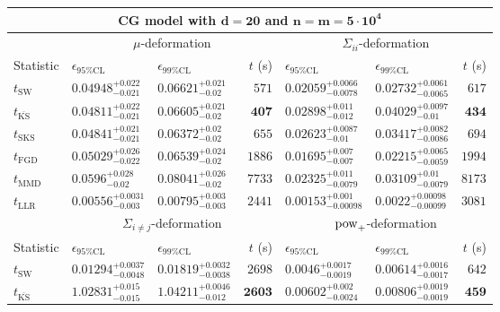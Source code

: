 \begin{tabular}{l|llr|llr}
	\toprule
	\multicolumn{7}{c}{{\bf CG model with $\mathbf{d=20}$ and $\mathbf{n=m=5\cdot 10^{4}}$}} \\
	\toprule
	\multicolumn{1}{c}{} & \multicolumn{3}{c}{$\mu$-deformation} & \multicolumn{3}{c}{$\Sigma_{ii}$-deformation} \\
	Statistic & $\epsilon_{95\%\mathrm{CL}}$ & $\epsilon_{99\%\mathrm{CL}}$ & $t$ (s) & $\epsilon_{95\%\mathrm{CL}}$ & $\epsilon_{99\%\mathrm{CL}}$ & $t$ (s) \\
	\midrule
	$t_{\mathrm{SW}}$ & $0.04948_{-0.021}^{+0.022}$ & $0.06621_{-0.02}^{+0.021}$ & $571$ & $0.02059_{-0.0078}^{+0.0066}$ & $0.02732_{-0.0065}^{+0.0061}$ & $617$ \\
	$t_{\overline{\mathrm{KS}}}$ & ${\mathbf{0.04811_{-0.021}^{+0.022}}}$ & $0.06605_{-0.02}^{+0.021}$ & ${\mathbf{407}}$ & $0.02898_{-0.012}^{+0.011}$ & $0.04029_{-0.01}^{+0.0097}$ & ${\mathbf{434}}$ \\
	$t_{\mathrm{SKS}}$ & $0.04841_{-0.021}^{+0.021}$ & ${\mathbf{0.06372_{-0.02}^{+0.02}}}$ & $655$ & $0.02623_{-0.01}^{+0.0087}$ & $0.03417_{-0.0086}^{+0.0082}$ & $694$ \\
	$t_{\mathrm{FGD}}$ & $0.05029_{-0.022}^{+0.026}$ & $0.06539_{-0.02}^{+0.024}$ & $1886$ & ${\mathbf{0.01695_{-0.007}^{+0.007}}}$ & ${\mathbf{0.02215_{-0.0059}^{+0.0065}}}$ & $1994$ \\
	$t_{\mathrm{MMD}}$ & $0.0596_{-0.02}^{+0.028}$ & $0.08041_{-0.02}^{+0.026}$ & $7733$ & $0.02325_{-0.0079}^{+0.011}$ & $0.03109_{-0.0079}^{+0.01}$ & $8173$ \\
	$t_{\mathrm{LLR}}$ & $0.00556_{-0.003}^{+0.0031}$ & $0.00795_{-0.003}^{+0.003}$ & $2441$ & $0.00153_{-0.00098}^{+0.001}$ & $0.0022_{-0.00099}^{+0.00098}$ & $3081$ \\
	\toprule
	\multicolumn{1}{c}{} & \multicolumn{3}{c}{$\Sigma_{i\neq j}$-deformation} & \multicolumn{3}{c}{$\rm{pow}_{+}$-deformation} \\
	Statistic & $\epsilon_{95\%\mathrm{CL}}$ & $\epsilon_{99\%\mathrm{CL}}$ & $t$ (s) & $\epsilon_{95\%\mathrm{CL}}$ & $\epsilon_{99\%\mathrm{CL}}$ & $t$ (s) \\
	\midrule
	$t_{\mathrm{SW}}$ & $0.01294_{-0.0048}^{+0.0037}$ & $0.01819_{-0.0038}^{+0.0032}$ & $2698$ & $0.0046_{-0.0019}^{+0.0017}$ & $0.00614_{-0.0017}^{+0.0016}$ & $642$ \\
	$t_{\overline{\mathrm{KS}}}$ & $1.02831_{-0.015}^{+0.015}$ & $1.04211_{-0.012}^{+0.0046}$ & ${\mathbf{2603}}$ & $0.00602_{-0.0024}^{+0.002}$ & $0.00806_{-0.0019}^{+0.0019}$ & ${\mathbf{459}}$ \\

\end{tabular}
